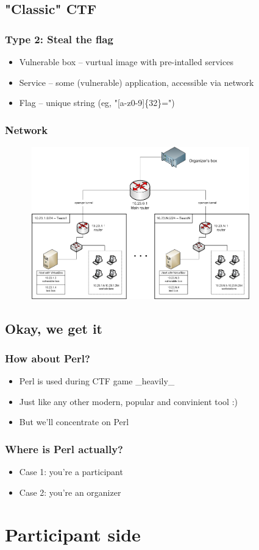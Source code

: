 \documentclass{beamer}
\begin{document}
\subsection{"Classic" CTF}
\frame
{
\frametitle{Type 2: Steal the flag}
\begin{itemize}
\item Vulnerable box -- vurtual image with pre-intalled services
\item Service -- some (vulnerable) application, accessible via network
\item Flag -- unique string (eg, "[a-z0-9]\{32\}=")
\end{itemize}
}

\frame
{
\frametitle{Network}
\begin{figure}
\includegraphics[width=3.8in,height=2.6in]{pics/network.png}
\end{figure}
}

\subsection{Okay, we get it}
\frame
{
\frametitle{How about Perl?}
\begin{itemize}
\item<1-> Perl is used during CTF game \_heavily\_
\item<2-> Just like any other modern, popular and convinient tool :)
\item<3-> But we'll concentrate on Perl
\end{itemize}
}

\frame
{
\frametitle{Where is Perl actually?}
\begin{itemize}
\item Case 1: you're a participant
\item Case 2: you're an organizer
\end{itemize}
}

\section{Participant side}
\end{document}
